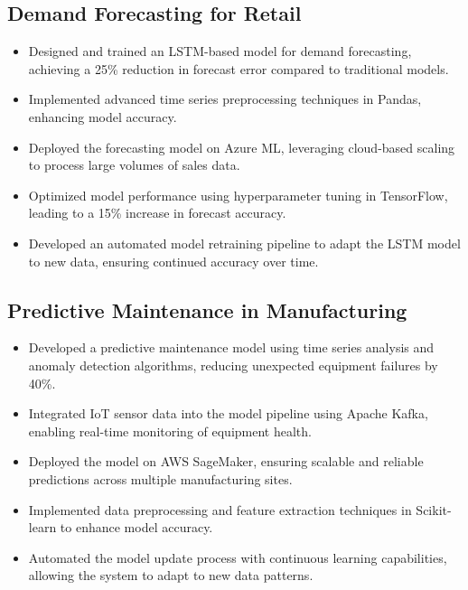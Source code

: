 \documentclass[12pt,a4paper]{article}
\begin{document}
\subsection*{Demand Forecasting for Retail}
\begin{itemize}[leftmargin=*,noitemsep,topsep=0pt]
\item Designed and trained an LSTM-based model for demand forecasting, achieving a 25\% reduction in forecast error compared to traditional models.
\item Implemented advanced time series preprocessing techniques in Pandas, enhancing model accuracy.
\item Deployed the forecasting model on Azure ML, leveraging cloud-based scaling to process large volumes of sales data.
\item Optimized model performance using hyperparameter tuning in TensorFlow, leading to a 15\% increase in forecast accuracy.
\item Developed an automated model retraining pipeline to adapt the LSTM model to new data, ensuring continued accuracy over time.
\end{itemize}

\subsection*{Predictive Maintenance in Manufacturing}
\begin{itemize}[leftmargin=*,noitemsep,topsep=0pt]
\item Developed a predictive maintenance model using time series analysis and anomaly detection algorithms, reducing unexpected equipment failures by 40\%.
\item Integrated IoT sensor data into the model pipeline using Apache Kafka, enabling real-time monitoring of equipment health.
\item Deployed the model on AWS SageMaker, ensuring scalable and reliable predictions across multiple manufacturing sites.
\item Implemented data preprocessing and feature extraction techniques in Scikit-learn to enhance model accuracy.
\item Automated the model update process with continuous learning capabilities, allowing the system to adapt to new data patterns.
\end{itemize}
\end{document}
